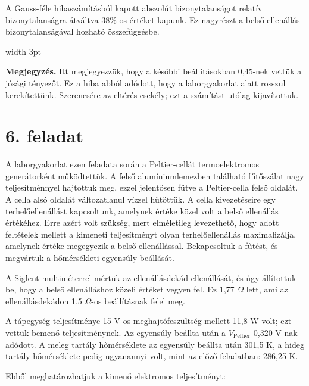 \documentclass[11pt]{article}
\begin{document}
A Gauss-féle hibaszámításból kapott abszolút bizonytalanságot relatív bizonytalanságra átváltva $38\%$-os értéket kapunk. Ez nagyrészt a belső ellenállás bizonytalanságával hozható összefüggésbe.

\begin{center}
\colorbox{gray!10}{%
\begin{minipage}{0.92\textwidth}
\noindent\textcolor{gray!70}{\vrule width 3pt}\hspace{0.8em}%
\begin{minipage}{0.88\textwidth}
\textbf{Megjegyzés.} Itt megjegyezzük, hogy a későbbi beállításokban 0,45-nek vettük a jósági tényezőt. Ez a hiba abból adódott, hogy a laborgyakorlat alatt rosszul kerekítettünk. Szerencsére az eltérés csekély; ezt a számítást utólag kijavítottuk.
\end{minipage}
\end{minipage}%
}
\end{center}

\section*{6. feladat}

A laborgyakorlat ezen feladata során a Peltier-cellát termoelektromos generátorként működtettük. A felső alumíniumlemezben található fűtőszálat nagy teljesítménnyel hajtottuk meg, ezzel jelentősen fűtve a Peltier-cella felső oldalát. A cella alsó oldalát változatlanul vízzel hűtöttük. A cella kivezetéseire egy terhelőellenállást kapcsoltunk, amelynek értéke közel volt a belső ellenállás értékéhez. Erre azért volt szükség, mert elméletileg levezethető, hogy adott feltételek mellett a kimeneti teljesítményt olyan terhelőellenállás maximalizálja, amelynek értéke megegyezik a belső ellenállással. Bekapcsoltuk a fűtést, és megvártuk a hőmérsékleti egyensúly beállását.

A Siglent multiméterrel mértük az ellenállásdekád ellenállását, és úgy állítottuk be, hogy a belső ellenálláshoz közeli értéket vegyen fel. Ez 1,77 $\Omega$ lett, ami az ellenállásdekádon 1,5 $\Omega$-os beállításnak felel meg.

A tápegység teljesítménye 15 V-os meghajtófeszültség mellett 11,8 W volt; ezt vettük bemenő teljesítménynek. Az egyensúly beállta után a $V_{\text{Peltier}}$ 0,320 V-nak adódott. A meleg tartály hőmérséklete az egyensúly beállta után 301,5 K, a hideg tartály hőmérséklete pedig ugyanannyi volt, mint az előző feladatban: 286,25 K.

Ebből meghatározhatjuk a kimenő elektromos teljesítményt:
\end{document}
